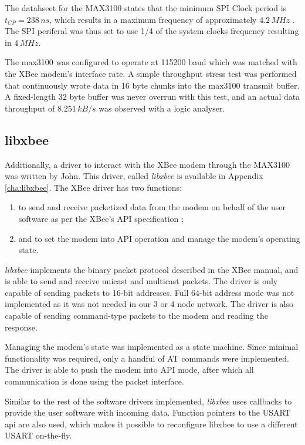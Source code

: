 The datahseet for the MAX3100 states that the minimum SPI Clock period is $t_{CP}=238\, ns$, which results in a maximum frequency of approximately $4.2\, MHz$ \cite{MAX3100}. The SPI periferal was thus set to use 1/4 of the system clocks frequency resulting in $4\, MHz$.

The max3100 was configured to operate at 115200 baud which was matched with the XBee modem's interface rate. A simple throughput stress test was performed that continuously wrote data in 16 byte chunks into the max3100 transmit buffer. A fixed-length 32 byte buffer was never overrun with this test, and an actual data throughput of $8.251\, kB/s$ was observed with a logic analyser.


\subsection{libxbee}

Additionally, a driver to interact with the XBee modem through the MAX3100 was written by John. This driver, called \emph{libxbee} is available in Appendix \ref{cha:libxbee}. The XBee driver has two functions: 
\begin{enumerate}
\item to send and receive packetized data from the modem on behalf of the user software as per the XBee's API specification \cite{XBeeManual};
\item and to set the modem into API operation and manage the modem's operating state. 
\end{enumerate}
\emph{libxbee} implements the binary packet protocol described in the XBee manual, and is able to send and receive unicast and multicast packets. The driver is only capable of sending packets to 16-bit addresses. Full 64-bit address mode was not implemented as it was not needed in our 3 or 4 node network. The driver is also capable of sending command-type packets to the modem and reading the response.

Managing the modem's state was implemented as a state machine. Since minimal functionality was required, only a handful of AT commands were implemented. The driver is able to push the modem into API mode, after which all communication is done using the packet interface.

Similar to the rest of the software drivers implemented, \emph{libxbee} uses callbacks to provide the user software with incoming data. Function pointers to the USART api are also used, which makes it possible to reconfigure libxbee to use a different USART on-the-fly.

